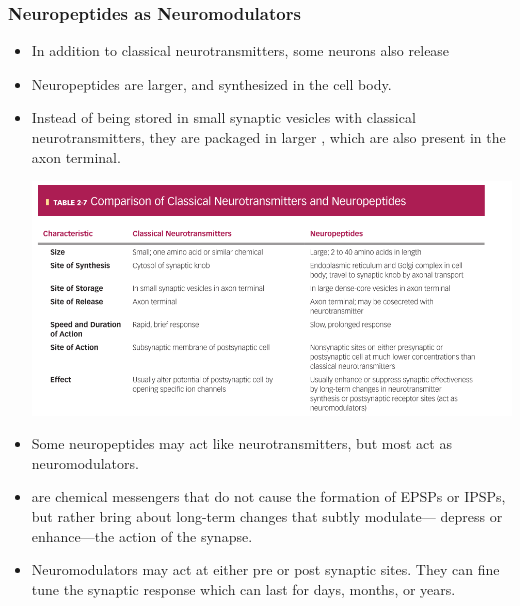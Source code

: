 \documentclass{article}
\numberwithin{equation}{section}
\begin{document}
\subsubsection{Neuropeptides as Neuromodulators}
\begin{itemize}
    \item In addition to classical neurotransmitters, some neurons also release 
    \item Neuropeptides are larger, and synthesized in the cell body.
    \item Instead of being stored in small synaptic vesicles with classical neurotransmitters, they are packaged in larger , which are also present in the axon terminal.
    \begin{center}
        \includegraphics[width=0.8\linewidth]{figures/neurotransmitter-vs-neuropeptide.png}
    \end{center}
    \item Some neuropeptides may act like neurotransmitters, but most act as neuromodulators.
    \item {} are chemical messengers that do not cause the formation of EPSPs or IPSPs, but rather bring about long-term changes that subtly ­modulate— depress or enhance—the action of the synapse.
    \item Neuromodulators may act at either pre or post synaptic sites. They can fine tune the synaptic response which can last for days, months, or years.
\end{itemize}
\end{document}
